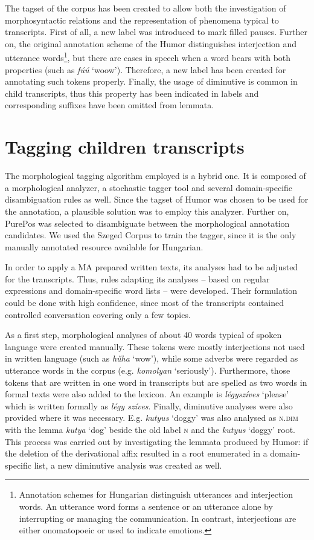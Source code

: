 The tagset of the corpus has been created to allow both the investigation of morphosyntactic relations and the representation of phenomena typical to transcripts. 
First of all, a new label was introduced to mark filled pauses. 
Further on, the original annotation scheme of the Humor distinguishes interjection and utterance words\footnote{Annotation schemes for Hungarian distinguish utterances and interjection words. An utterance word forms a sentence or an utterance alone by interrupting or managing the communication. In contrast, interjections are either onomatopoeic or used to indicate emotions.},
but there are cases in speech when a word bears with both properties (such as \textit{fúú} `woow’). 
Therefore, a new label has been created for annotating such tokens properly. 
Finally, the usage of diminutive is common in child transcripts, thus this property has been indicated in labels and corresponding suffixes have been omitted from lemmata.

\section{Tagging children transcripts}
\label{sec:tagging}
The morphological tagging algorithm employed is a hybrid one. 
It is composed of a morphological analyzer, a stochastic tagger tool and several domain-specific disambiguation rules as well. 
Since the tagset of Humor was chosen to be used for the annotation, a plausible solution was to employ this analyzer. 
Further on, PurePos was selected to disambiguate between the morphological annotation candidates. 
We used the Szeged Corpus to train the tagger, since it is the only manually annotated resource available for Hungarian. 

In order to apply a MA prepared written texts, its analyses had to be adjusted for the transcripts. 
Thus, rules adapting its analyses -- based on regular expressions and domain-specific word lists -- were developed.
Their formulation could be done with high confidence, since most of the transcripts contained controlled conversation covering only a few topics. 

As a first step, morphological analyses of about 40 words typical of spoken language were created manually. 
These tokens were mostly interjections not used in written language (such as \textit{hűha} `wow’), while some adverbs were regarded as utterance words in the corpus (e.g. \textit{komolyan} `seriously’). 
Furthermore, those tokens that are written in one word in transcripts but are spelled as two words in formal texts were also added to the lexicon. 
An example is \textit{légyszíves} `please’ which is written formally as \textit{légy szíves}. Finally, diminutive analyses were also provided where it was necessary. 
E.g. \textit{kutyus} `doggy’ was also analysed as \textsc{n.dim} with the lemma \textit{kutya} `dog’ beside the old label \textsc{n} and the \textit{kutyus} `doggy’ root. This process was carried out by investigating the lemmata produced by Humor: if the deletion of the derivational affix resulted in a root enumerated in a domain-specific list, a new diminutive analysis was created as well. 

